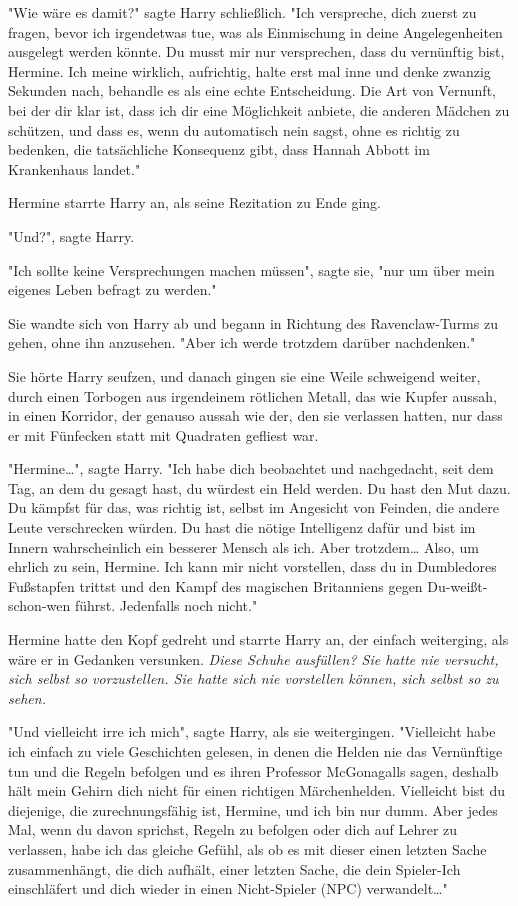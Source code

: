 {"Wie wäre es damit?" sagte Harry schließlich. "Ich verspreche, dich zuerst zu fragen, bevor ich irgendetwas tue, was als Einmischung in deine Angelegenheiten ausgelegt werden könnte. Du musst mir nur versprechen, dass du vernünftig bist, Hermine. Ich meine wirklich, aufrichtig, halte erst mal inne und denke zwanzig Sekunden nach, behandle es als eine echte Entscheidung. Die Art von Vernunft, bei der dir klar ist, dass ich dir eine Möglichkeit anbiete, die anderen Mädchen zu schützen, und dass es, wenn du automatisch nein sagst, ohne es richtig zu bedenken, die tatsächliche Konsequenz gibt, dass Hannah Abbott im Krankenhaus landet."

Hermine starrte Harry an, als seine Rezitation zu Ende ging.

"Und?", sagte Harry.

"Ich sollte keine Versprechungen machen müssen", sagte sie, "nur um über mein eigenes Leben befragt zu werden."

Sie wandte sich von Harry ab und begann in Richtung des Ravenclaw-Turms zu gehen, ohne ihn anzusehen. "Aber ich werde trotzdem darüber nachdenken."

Sie hörte Harry seufzen, und danach gingen sie eine Weile schweigend weiter, durch einen Torbogen aus irgendeinem rötlichen Metall, das wie Kupfer aussah, in einen Korridor, der genauso aussah wie der, den sie verlassen hatten, nur dass er mit Fünfecken statt mit Quadraten gefliest war.

"Hermine…", sagte Harry. "Ich habe dich beobachtet und nachgedacht, seit dem Tag, an dem du gesagt hast, du würdest ein Held werden. Du hast den Mut dazu. Du kämpfst für das, was richtig ist, selbst im Angesicht von Feinden, die andere Leute verschrecken würden. Du hast die nötige Intelligenz dafür und bist im Innern wahrscheinlich ein besserer Mensch als ich. Aber trotzdem… Also, um ehrlich zu sein, Hermine. Ich kann mir nicht vorstellen, dass du in Dumbledores Fußstapfen trittst und den Kampf des magischen Britanniens gegen Du-weißt-schon-wen führst. Jedenfalls noch nicht."

Hermine hatte den Kopf gedreht und starrte Harry an, der einfach weiterging, als wäre er in Gedanken versunken. \emph{Diese Schuhe ausfüllen? Sie hatte nie versucht, sich selbst so vorzustellen. Sie hatte sich nie vorstellen können, sich selbst so zu sehen.}

"Und vielleicht irre ich mich", sagte Harry, als sie weitergingen. "Vielleicht habe ich einfach zu viele Geschichten gelesen, in denen die Helden nie das Vernünftige tun und die Regeln befolgen und es ihren Professor McGonagalls sagen, deshalb hält mein Gehirn dich nicht für einen richtigen Märchenhelden. Vielleicht bist du diejenige, die zurechnungsfähig ist, Hermine, und ich bin nur dumm. Aber jedes Mal, wenn du davon sprichst, Regeln zu befolgen oder dich auf Lehrer zu verlassen, habe ich das gleiche Gefühl, als ob es mit dieser einen letzten Sache zusammenhängt, die dich aufhält, einer letzten Sache, die dein Spieler-Ich einschläfert und dich wieder in einen Nicht-Spieler (NPC) verwandelt…"

}

